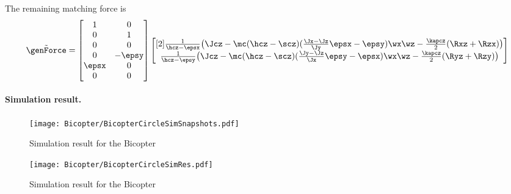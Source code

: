 The remaining matching force is
\begin{align}
 \tilde{\genForce} = 
 \begin{bmatrix} 1 & 0 \\ 0 & 1 \\ 0 & 0 \\ 0 & -\epsy \\ \epsx & 0 \\ 0 & 0 \end{bmatrix}
 \begin{bmatrix}[2]
  \frac{1}{\hcz-\epsx} \big( \Jcz - \mc(\hcz-\scz) (\tfrac{\Jx-\Jz}{\Jy}\epsx - \epsy) \wx\wz - \tfrac{\kapcz}{2}(\Rxz+\Rzx) \big) \\
  \frac{1}{\hcz-\epsy} \big( \Jcz - \mc(\hcz-\scz) (\tfrac{\Jy-\Jz}{\Jx}\epsy - \epsx) \wx\wz - \tfrac{\kapcz}{2}(\Ryz+\Rzy) \big)
 \end{bmatrix}
\end{align}

\paragraph{Simulation result.}

\begin{figure}[ht]
 \centering
 \texttt{[image: Bicopter/BicopterCircleSimSnapshots.pdf]}
 \caption{Simulation result for the Bicopter}
 \label{fig:BicopterCircleSimSnapshots}
\end{figure}

\begin{figure}[p]
 \centering
 \texttt{[image: Bicopter/BicopterCircleSimRes.pdf]}
 \caption{Simulation result for the Bicopter}
 \label{fig:BicopterCircleSimRes}
\end{figure}
